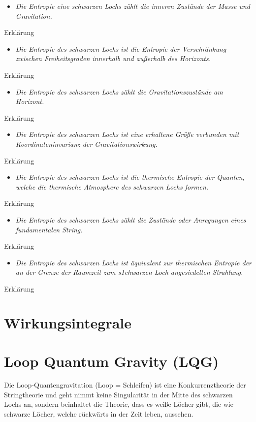 \documentclass[ngerman]{scrartcl}
\begin{document}
	\begin{itemize}
		\item [~] \textit{Die Entropie eine schwarzen Lochs zählt die inneren Zustände der Masse und Gravitation.}
	\end{itemize}
	Erklärung	
	\begin{itemize}
		\item [~] \textit{Die Entropie des schwarzen Lochs ist die Entropie der Verschränkung zwischen Freiheitsgraden innerhalb und außerhalb des Horizonts.}
	\end{itemize}
	Erklärung
	\begin{itemize}
		\item [~] \textit{Die Entropie des schwarzen Lochs zählt die Gravitationszustände am Horizont.}
	\end{itemize}
	Erklärung
	\begin{itemize}
		\item [~] \textit{Die Entropie des schwarzen Lochs ist eine erhaltene Größe verbunden mit Koordinateninvarianz der Gravitationswirkung.}
	\end{itemize}
	Erklärung
	\begin{itemize}
		\item [~] \textit{Die Entropie des schwarzen Lochs ist die thermische Entropie der Quanten, welche die thermische Atmosphere des schwarzen Lochs formen.}
	\end{itemize}
	Erklärung
	\begin{itemize}
		\item [~] \textit{Die Entropie des schwarzen Lochs zählt die Zustände oder Anregungen eines fundamentalen String.}
	\end{itemize}
	Erklärung
	\begin{itemize}
		\item [~] \textit{Die Entropie des schwarzen Lochs ist äquivalent zur thermischen Entropie der an der Grenze der Raumzeit zum s1chwarzen Loch angesiedelten Strahlung.}
	\end{itemize}
	Erklärung
	
\section{Wirkungsintegrale}

\section{Loop Quantum Gravity (LQG)}	
Die Loop-Quantengravitation (Loop = Schleifen) ist eine Konkurrenztheorie der Stringtheorie und geht nimmt keine Singularität in der Mitte des schwarzen Lochs an, sondern beinhaltet die Theorie, dass es weiße Löcher gibt, die wie schwarze Löcher, welche rückwärts in der Zeit leben, aussehen. 
\end{document}
